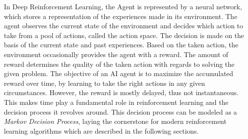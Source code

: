 \documentclass[12pt,a4paper]{article}
\begin{document}
In Deep Reinforcement Learning, the Agent is represented by a neural network, which stores a representation of the experiences made in its environment. The agent observes the current state of the environment and decides which action to take from a pool of actions, called the action space.
The decision is made on the basis of the current state and past experiences. Based on the taken action, the environment occasionally provides the agent with a reward. The amount of reward determines the quality of the taken action with regards to solving the given problem.
The objective of an AI agent is to maximize the accumulated reward over time, by learning to take the right actions in any given circumstances.
However, the reward is mostly delayed, thus not instantaneous. This makes time play a fundamental role in reinforcement learning and the decision process it revolves around.
This decision process can be modeled as a {\it Markov Decision Process}, laying the cornerstone for modern reinforcement learning algorithms which are described in the following sections.
\end{document}
